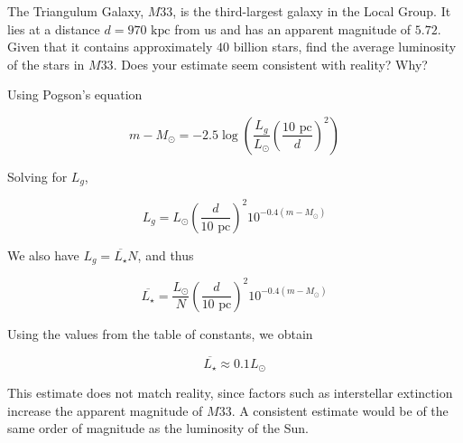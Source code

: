 \documentclass[11pt]{article}
\begin{document}
\begin{pproblem} The Triangulum Galaxy, \(M33\), is the third-largest galaxy in the Local Group. It lies at a distance \(d=970 \text{ kpc}\) from us and has an apparent magnitude of \(5.72\). Given that it contains approximately \(40\) billion stars, find the average luminosity of the stars in \(M33\). Does your estimate seem consistent with reality? Why?
\begin{pssolution*}{}{}
    Using Pogson's equation

    \[m-M_\odot = -2.5\log \left(\frac{L_{g}}{L_\odot}\left(\frac{10 \text{ pc}}{d}\right)^2\right)\]

    Solving for \(L_g\),

    \[L_g = L_\odot \left(\frac{d}{10\text{ pc}}\right)^2 10^{-0.4(m-M_\odot)}\]

    We also have \(L_g = \overline{L_\star} N\), and thus

    \[\overline{L_\star} = \frac{L_\odot}{N} \left(\frac{d}{10\text{ pc}}\right)^2 10^{-0.4(m-M_\odot)}\]

    Using the values from the table of constants, we obtain

    \[\overline{L_\star} \approx 0.1L_\odot\]

    This estimate does not match reality, since factors such as interstellar extinction increase the apparent magnitude of \(M33\). A consistent estimate would be of the same order of magnitude as the luminosity of the Sun.

\end{pssolution*}
\end{pproblem}
\end{document}
